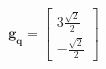 \documentclass[preview]{standalone}
\begin{document}
\begin{align*}
\mathbf{g_q} = \begin{bmatrix} 3 \frac{\sqrt{2}}{2} \\ - \frac{\sqrt{2}}{2} \end{bmatrix}
\end{align*}
\end{document}
